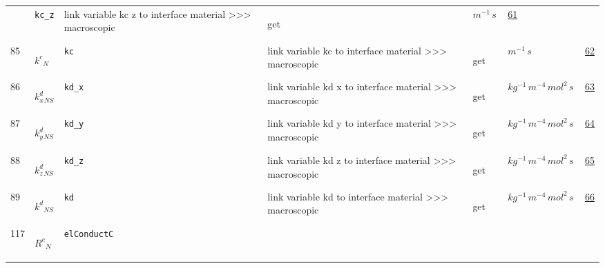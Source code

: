 \begin{longtable}{|p{1cm}|p{2.5cm}|p{4.5cm}|p{8cm}|p{3.0cm}|p{3cm}|p{1cm}|}
             & \verb|kc_z|
             & link variable kc z to interface material >>> macroscopic
             & \begin{lay}get \end{lay}
             & $ m^{-1} \,s \, $
             & \hyperlink{"e:61"}{ 61 }
                 \\
    85
             & \hypertarget{"v:85"}{ $ {{k^c}}{_{N}} $}
             & \verb|kc|
             & link variable kc to interface material >>> macroscopic
             & \begin{lay}get \end{lay}
             & $ m^{-1} \,s \, $
             & \hyperlink{"e:62"}{ 62 }
                 \\
    86
             & \hypertarget{"v:86"}{ $ {{k^d_x}}{_{{N S}}} $}
             & \verb|kd_x|
             & link variable kd x to interface material >>> macroscopic
             & \begin{lay}get \end{lay}
             & $ kg^{-1} \,m^{-4} \,mol^{2} \,s \, $
             & \hyperlink{"e:63"}{ 63 }
                 \\
    87
             & \hypertarget{"v:87"}{ $ {{k^d_y}}{_{{N S}}} $}
             & \verb|kd_y|
             & link variable kd y to interface material >>> macroscopic
             & \begin{lay}get \end{lay}
             & $ kg^{-1} \,m^{-4} \,mol^{2} \,s \, $
             & \hyperlink{"e:64"}{ 64 }
                 \\
    88
             & \hypertarget{"v:88"}{ $ {{k^d_z}}{_{{N S}}} $}
             & \verb|kd_z|
             & link variable kd z to interface material >>> macroscopic
             & \begin{lay}get \end{lay}
             & $ kg^{-1} \,m^{-4} \,mol^{2} \,s \, $
             & \hyperlink{"e:65"}{ 65 }
                 \\
    89
             & \hypertarget{"v:89"}{ $ {{k^d}}{_{{N S}}} $}
             & \verb|kd|
             & link variable kd to interface material >>> macroscopic
             & \begin{lay}get \end{lay}
             & $ kg^{-1} \,m^{-4} \,mol^{2} \,s \, $
             & \hyperlink{"e:66"}{ 66 }
                 \\
    117
             & \hypertarget{"v:117"}{ $ {{R^e}}{_{N}} $}
             & \verb|elConductC|

\end{longtable}
